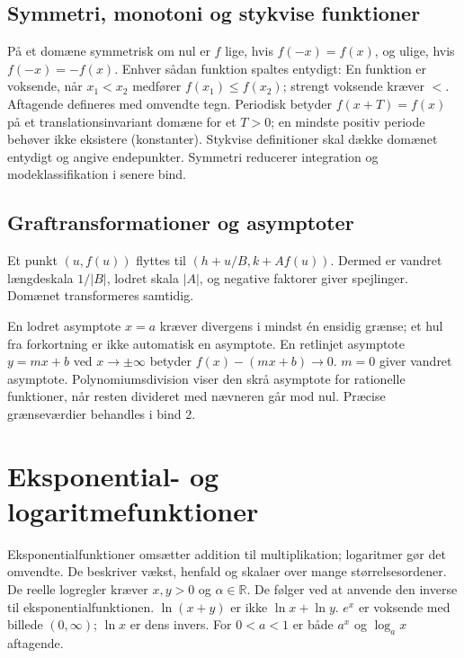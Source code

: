 

\subsection{Symmetri, monotoni og stykvise funktioner}
På et domæne symmetrisk om nul er $f$ lige, hvis $f(-x)=f(x)$, og ulige,
hvis $f(-x)=-f(x)$. Enhver sådan funktion spaltes entydigt:
En funktion er voksende, når $x_1<x_2$ medfører $f(x_1)\le f(x_2)$;
strengt voksende kræver $<$. Aftagende defineres med omvendte tegn.
Periodisk betyder $f(x+T)=f(x)$ på et translationsinvariant domæne for
et $T>0$; en mindste positiv periode behøver ikke eksistere (konstanter).
Stykvise definitioner skal dække domænet entydigt og angive endepunkter.
Symmetri reducerer integration og modeklassifikation i senere bind.

\subsection{Graftransformationer og asymptoter}
Et punkt $(u,f(u))$ flyttes til $(h+u/B,k+Af(u))$.
Dermed er vandret længdeskala $1/|B|$, lodret skala $|A|$, og negative
faktorer giver spejlinger. Domænet transformeres samtidig.





En lodret asymptote $x=a$ kræver divergens i mindst én ensidig grænse;
et hul fra forkortning er ikke automatisk en asymptote.
En retlinjet asymptote $y=mx+b$ ved $x\to\pm\infty$ betyder
$f(x)-(mx+b)\to0$. $m=0$ giver vandret asymptote.
Polynomiumsdivision viser den skrå asymptote for rationelle funktioner,
når resten divideret med nævneren går mod nul. Præcise grænseværdier
behandles i bind 2.



\section{Eksponential- og logaritmefunktioner}
\label{sec:b1-log}
Eksponentialfunktioner omsætter addition til multiplikation; logaritmer
gør det omvendte. De beskriver vækst, henfald og skalaer over mange størrelsesordener.
De reelle logregler kræver $x,y>0$ og $\alpha\in\mathbb R$.
De følger ved at anvende den inverse til eksponentialfunktionen.
$\ln(x+y)$ er ikke $\ln x+\ln y$.
$e^x$ er voksende med billede $(0,\infty)$; $\ln x$ er dens invers.
For $0<a<1$ er både $a^x$ og $\log_a x$ aftagende.

